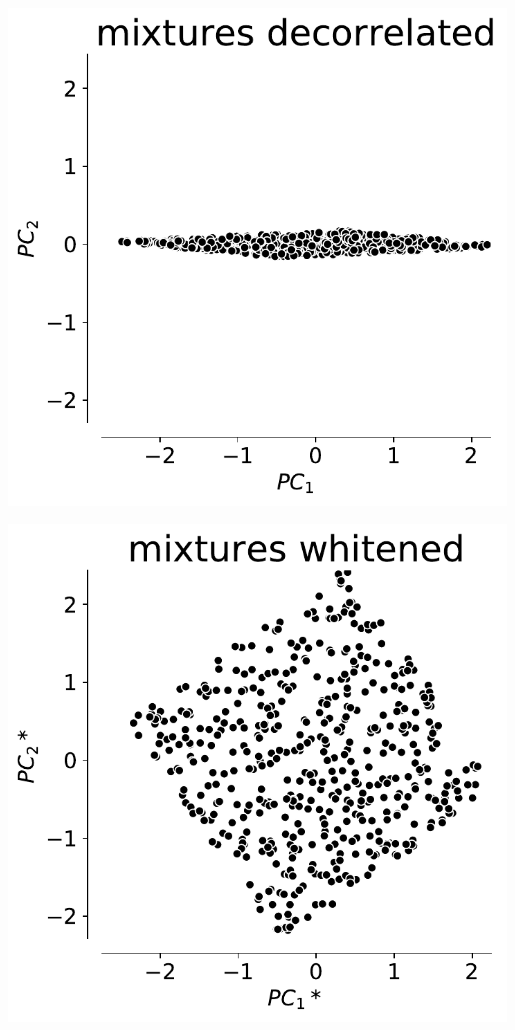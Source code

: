 \begin{frame}{\subsubsecname}
\begin{center}
  \begin{minipage}{0.29\textwidth}
\includegraphics[width=0.99\textwidth]{./img/uniform_mixtures_decorrelated} 
  \end{minipage}
  \hspace{5mm}
  \begin{minipage}{0.29\textwidth}
\includegraphics[width=0.99\textwidth]{./img/uniform_mixtures_whitened} 
  \end{minipage}
\end{center}

\end{frame}

